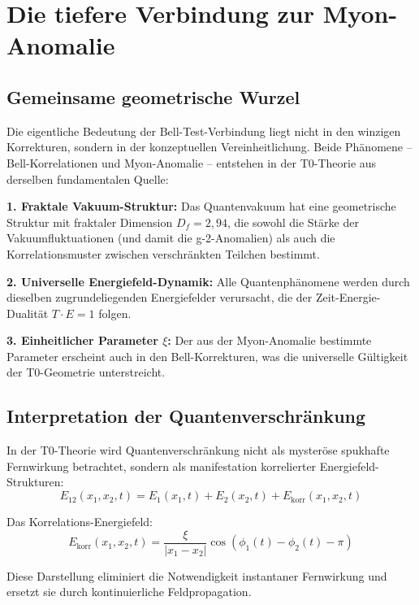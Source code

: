 \documentclass[12pt,a4paper]{article}
\begin{document}
	\section{Die tiefere Verbindung zur Myon-Anomalie}
	
	
		\subsection{Gemeinsame geometrische Wurzel}
		
		Die eigentliche Bedeutung der Bell-Test-Verbindung liegt nicht in den winzigen Korrekturen, sondern in der konzeptuellen Vereinheitlichung. Beide Ph\"anomene -- Bell-Korrelationen und Myon-Anomalie -- entstehen in der T0-Theorie aus derselben fundamentalen Quelle:
		
		\textbf{1. Fraktale Vakuum-Struktur:}
		Das Quantenvakuum hat eine geometrische Struktur mit fraktaler Dimension $D_f = 2{,}94$, die sowohl die St\"arke der Vakuumfluktuationen (und damit die g-2-Anomalien) als auch die Korrelationsmuster zwischen verschr\"ankten Teilchen bestimmt.
		
		\textbf{2. Universelle Energiefeld-Dynamik:}
		Alle Quantenph\"anomene werden durch dieselben zugrundeliegenden Energiefelder verursacht, die der Zeit-Energie-Dualit\"at $T \cdot E = 1$ folgen.
		
		\textbf{3. Einheitlicher Parameter $\xi$:}
		Der aus der Myon-Anomalie bestimmte Parameter erscheint auch in den Bell-Korrekturen, was die universelle G\"ultigkeit der T0-Geometrie unterstreicht.
		
		\subsection{Interpretation der Quantenverschr\"ankung}
		
		In der T0-Theorie wird Quantenverschr\"ankung nicht als mysteröse spukhafte Fernwirkung betrachtet, sondern als manifestation korrelierter Energiefeld-Strukturen:
		\begin{equation}
			E_{12}(x_1, x_2, t) = E_1(x_1, t) + E_2(x_2, t) + E_{\text{korr}}(x_1, x_2, t)
		\end{equation}
		
		Das Korrelations-Energiefeld:
		\begin{equation}
			E_{\text{korr}}(x_1, x_2, t) = \frac{\xi}{|x_1 - x_2|} \cos(\phi_1(t) - \phi_2(t) - \pi)
		\end{equation}
		
		Diese Darstellung eliminiert die Notwendigkeit instantaner Fernwirkung und ersetzt sie durch kontinuierliche Feldpropagation.
		
\end{document}
